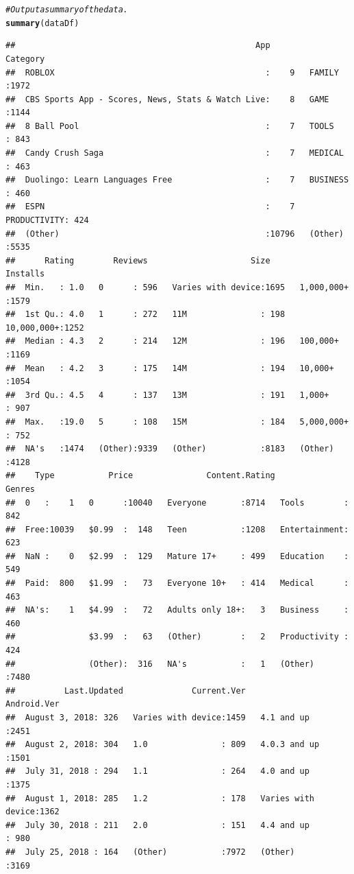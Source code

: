 \documentclass[12pt]{report}\usepackage[]{graphicx}\usepackage[]{xcolor}
\makeatletter
\newcommand{\hlcom}[1]{\textcolor[rgb]{0.678,0.584,0.686}{\textit{#1}}}%
\newcommand{\hlstd}[1]{\textcolor[rgb]{0.345,0.345,0.345}{#1}}%
\newcommand{\hlkwd}[1]{\textcolor[rgb]{0.737,0.353,0.396}{\textbf{#1}}}%
\newenvironment{kframe}{%
 \def\at@end@of@kframe{}%
 \ifinner\ifhmode%
  \def\at@end@of@kframe{\end{minipage}}%
  \begin{minipage}{\columnwidth}%
 \fi\fi%
 \def\FrameCommand##1{\hskip\@totalleftmargin \hskip-\fboxsep
 \colorbox{shadecolor}{##1}\hskip-\fboxsep
     \hskip-\linewidth \hskip-\@totalleftmargin \hskip\columnwidth}%
 \MakeFramed {\advance\hsize-\width
   \@totalleftmargin\z@ \linewidth\hsize
   \@setminipage}}%
 {\par\unskip\endMakeFramed%
 \at@end@of@kframe}
\newenvironment{knitrout}{}{} %
\makeatother
\begin{document}
\begin{knitrout}
\begin{kframe}
\begin{alltt}
\hlcom{# Output a summary of the data.}
\hlkwd{summary}\hlstd{(dataDf)}
\end{alltt}
\begin{verbatim}
##                                                 App                Category   
##  ROBLOX                                           :    9   FAMILY      :1972  
##  CBS Sports App - Scores, News, Stats & Watch Live:    8   GAME        :1144  
##  8 Ball Pool                                      :    7   TOOLS       : 843  
##  Candy Crush Saga                                 :    7   MEDICAL     : 463  
##  Duolingo: Learn Languages Free                   :    7   BUSINESS    : 460  
##  ESPN                                             :    7   PRODUCTIVITY: 424  
##  (Other)                                          :10796   (Other)     :5535  
##      Rating        Reviews                     Size             Installs   
##  Min.   : 1.0   0      : 596   Varies with device:1695   1,000,000+ :1579  
##  1st Qu.: 4.0   1      : 272   11M               : 198   10,000,000+:1252  
##  Median : 4.3   2      : 214   12M               : 196   100,000+   :1169  
##  Mean   : 4.2   3      : 175   14M               : 194   10,000+    :1054  
##  3rd Qu.: 4.5   4      : 137   13M               : 191   1,000+     : 907  
##  Max.   :19.0   5      : 108   15M               : 184   5,000,000+ : 752  
##  NA's   :1474   (Other):9339   (Other)           :8183   (Other)    :4128  
##    Type           Price               Content.Rating           Genres    
##  0   :    1   0      :10040   Everyone       :8714   Tools        : 842  
##  Free:10039   $0.99  :  148   Teen           :1208   Entertainment: 623  
##  NaN :    0   $2.99  :  129   Mature 17+     : 499   Education    : 549  
##  Paid:  800   $1.99  :   73   Everyone 10+   : 414   Medical      : 463  
##  NA's:    1   $4.99  :   72   Adults only 18+:   3   Business     : 460  
##               $3.99  :   63   (Other)        :   2   Productivity : 424  
##               (Other):  316   NA's           :   1   (Other)      :7480  
##          Last.Updated              Current.Ver               Android.Ver  
##  August 3, 2018: 326   Varies with device:1459   4.1 and up        :2451  
##  August 2, 2018: 304   1.0               : 809   4.0.3 and up      :1501  
##  July 31, 2018 : 294   1.1               : 264   4.0 and up        :1375  
##  August 1, 2018: 285   1.2               : 178   Varies with device:1362  
##  July 30, 2018 : 211   2.0               : 151   4.4 and up        : 980  
##  July 25, 2018 : 164   (Other)           :7972   (Other)           :3169  

\end{verbatim}
\end{kframe}
\end{knitrout}
\end{document}

